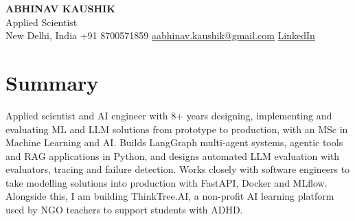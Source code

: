 \documentclass[10pt,a4paper]{article}
\begin{document}
\begin{center}
  {\LARGE\bfseries ABHINAV KAUSHIK}\\[2pt]
  {\large Applied Scientist}\\[2pt]
  New Delhi, India \textbar{} +91 8700571859 \textbar{} \href{mailto:aabhinav.kaushik@gmail.com}{aabhinav.kaushik@gmail.com} \textbar{} \href{https://www.linkedin.com/in/abhinav-kaushik10/}{LinkedIn}  
\end{center}

\section{Summary}
Applied scientist and AI engineer with 8+ years designing, implementing and evaluating ML and LLM solutions from prototype to production, with an MSc in Machine Learning and AI. Builds LangGraph multi-agent systems, agentic tools and RAG applications in Python, and designs automated LLM evaluation with evaluators, tracing and failure detection. Works closely with software engineers to take modelling solutions into production with FastAPI, Docker and MLflow. Alongside this, I am building ThinkTree.AI, a non-profit AI learning platform used by NGO teachers to support students with ADHD.
\end{document}
